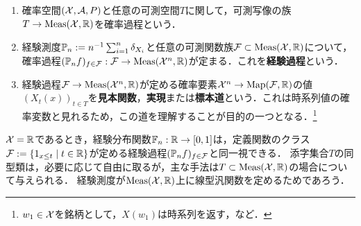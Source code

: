 \documentclass[uplatex,dvipdfmx]{jsreport}
\begin{document}
\begin{definition}\mbox{}
    \begin{enumerate}
        \item 確率空間$(\mathcal{X},\mathcal{A},P)$と任意の可測空間$T$に関して，可測写像の族$T\to\mathrm{Meas}(\mathcal{X},\mathbb{R})$を確率過程という．
        \item 経験測度$\mathbb{P}_n:=n^{-1}\sum_{i=1}^n\delta_{X_i}$と任意の可測関数族$\mathcal{F}\subset\mathrm{Meas}(\mathcal{X},\mathbb{R})$について，確率過程$(\mathbb{P}_nf)_{f\in\mathcal{F}}:\mathcal{F}\to\mathrm{Meas}(\mathcal{X}^n,\mathbb{R})$が定まる．これを\textbf{経験過程}という．
        \item 経験過程$\mathcal{F}\to\mathrm{Meas}(\mathcal{X}^n,\mathbb{R})$が定める確率要素$\mathcal{X}^n\to\mathrm{Map}(\mathcal{F},\mathbb{R})$の値$(X_t(x))_{t\in T}$を\textbf{見本関数}，\textbf{実現}または\textbf{標本道}という．これは時系列値の確率変数と見れるため，この道を理解することが目的の一つとなる．\footnote{$w_1\in\mathcal{X}$を銘柄として，$X(w_1)$は時系列を返す，など．}
    \end{enumerate}
\end{definition}
\begin{remarks}
    $\mathcal{X}=\mathbb{R}$であるとき，経験分布関数$\mathbb{F}_n:\mathbb{R}\to[0,1]$は，定義関数のクラス$\mathcal{F}:=\left\{1_{x\le t}\mid t\in\mathbb{R}\right\}$が定める経験過程$(\mathbb{P}_nf)_{f\in\mathcal{F}}$と同一視できる．
    添字集合$T$の同型類は，必要に応じて自由に取るが，主な手法は$T\subset\mathrm{Meas}(\mathcal{X},\mathbb{R})$の場合について与えられる．
    経験測度が$\mathrm{Meas}(\mathcal{X},\mathbb{R})$上に線型汎関数を定めるためであろう．
\end{remarks}
\end{document}
